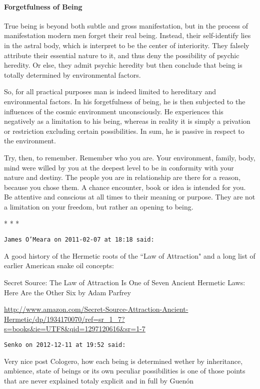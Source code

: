 \paragraph{Forgetfulness of Being}
True being is beyond both subtle and gross manifestation, but in the process of manifestation modern men forget their real being. Instead, their self-identify lies in the astral body, which is interpret to be the center of interiority. They falsely attribute their essential nature to it, and thus deny the possibility of psychic heredity. Or else, they admit psychic heredity but then conclude that being is totally determined by environmental factors.

So, for all practical purposes man is indeed limited to hereditary and environmental factors. In his forgetfulness of being, he is then subjected to the influences of the cosmic environment unconsciously. He experiences this negatively as a limitation to his being, whereas in reality it is simply a privation or restriction excluding certain possibilities. In sum, he is passive in respect to the environment.

Try, then, to remember. Remember who you are. Your environment, family, body, mind were willed by you at the deepest level to be in conformity with your nature and destiny. The people you are in relationship are there for a reason, because you chose them. A chance encounter, book or idea is intended for you. Be attentive and conscious at all times to their meaning or purpose. They are not a limitation on your freedom, but rather an opening to being.




\begin{center}* * *\end{center}

\begin{footnotesize}\begin{sffamily}



\texttt{James O'Meara on 2011-02-07 at 18:18 said: }

A good history of the Hermetic roots of the ``Law of Attraction" and a long list of earlier American snake oil concepts: 

Secret Source: The Law of Attraction Is One of Seven Ancient Hermetic Laws: Here Are the Other Six by Adam Parfrey

\url{http://www.amazon.com/Secret-Source-Attraction-Ancient-Hermetic/dp/1934170070/ref=sr\_1\_7?s=books\&ie=UTF8\&qid=1297120616\&sr=1-7}


\hfill

\texttt{Senko on 2012-12-11 at 19:52 said: }

Very nice post Cologero, how each being is determined wether by inheritance, ambience, state of beings or its own peculiar possibilities is one of those points that are never explained totaly explicit and in full by Guenón


\end{sffamily}\end{footnotesize}
